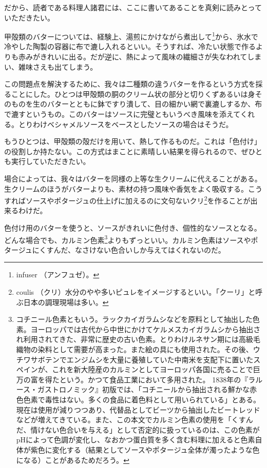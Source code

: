 だから、読者である料理人諸君には、ここに書いてあることを真剣に読みとっていただきたい。

甲殻類のバターについては、経験上、湯煎にかけながら煮出して\footnote{infuser
  （アンフュゼ）。}から、氷水で冷やした陶製の容器に布で漉し入れるといい。そうすれば、冷たい状態で作るよりも赤みがきれいに出る。だが逆に、熱によって風味の繊細さが失なわれてしまい、雑味さえも出てしまう。

この問題点を解決するために、我々は二種類の違うバターを作るという方式を採ることにした。ひとつは甲殻類の胴のクリーム状の部分と切りくずあるいは身そのものを生のバターとともに鉢ですり潰して、目の細かい網で裏漉しするか、布で漉すというもの。このバターはソースに完璧ともいうべき風味を添えてくれる。とりわけベシャメルソースをベースとしたソースの場合はそうだ。

もうひとつは、甲殻類の殻だけを用いて、熱して作るものだ。これは「色付け」の役割しか持たない。この方式はまことに素晴しい結果を得られるので、ぜひとも実行していただきたい。

場合によっては、我々はバターを同様の上等な生クリームに代えることがある。生クリームのほうがバターよりも、素材の持つ風味や香気をよく吸収する。こうすればソースやポタージュの仕上げに加えるのに文句ないクリ\footnote{coulis
  （クリ）水分のやや多いピュレをイメージするといい。「クーリ」と呼ぶ日本の調理現場は多い。}を作ることが出来るわけだ。

色付け用のバターを使うと、ソースがきれいに色付き、個性的なソースとなる。どんな場合でも、カルミン色素\footnote{コチニール色素ともいう。ラックカイガラムシなどを原料として抽出した色素。ヨーロッパでは古代から中世にかけてケルメスカイガラムシから抽出され利用されてきた、非常に歴史の古い色素。とりわけルネサン期には高級毛織物の染料として需要が高まった。また絵の具にも使用された。その後、ウチワサボテンでエンジムシを大量に養殖していた中南米を支配下に置いたスペインが、これを新大陸産のカルミンとしてヨーロッパ各国に売ることで巨万の富を得たという。かつて食品工業において多用された。
  1838年の『ラルース・ガストロノミック』初版では、「コチニールから抽出される鮮かな赤色色素で毒性はない。多くの食品に着色料として用いられている」とある。現在は使用が減りつつあり、代替品としてビーツから抽出したビートレッドなどが増えてきている。また、この本文でカルミン色素の使用を「くすんだ、情けない色合いを与える」として否定的に扱っているのは、この色素がpHによって色調が変化し、なおかつ蛋白質を多く含む料理に加えると色素自体が紫色に変化する（結果としてソースやポタージュ全体が濁ったような色になる）ことがあるためだろう。}よりもずっといい。カルミン色素はソースやポタージュにくすんだ、なさけない色合いしか与えてはくれないのだ。

